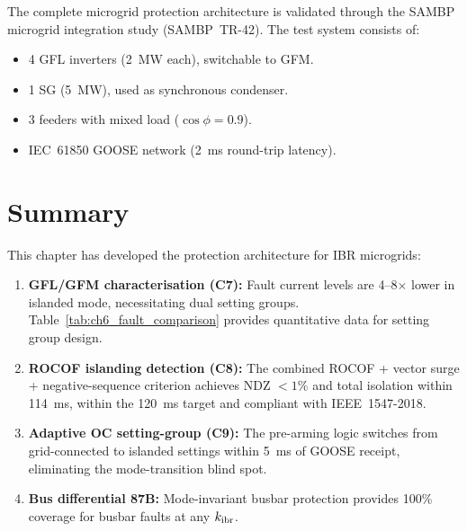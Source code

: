 The complete microgrid protection architecture is validated through the
SAMBP microgrid integration study (SAMBP~TR-42).
The test system consists of:
\begin{itemize}
\item 4 GFL inverters (2~MW each), switchable to GFM.
\item 1 SG (5~MW), used as synchronous condenser.
\item 3 feeders with mixed load ($\cos\phi = 0.9$).
\item IEC~61850 GOOSE network (2~ms round-trip latency).
\end{itemize}


\section{Summary}
\label{sec:ch6_summary}

This chapter has developed the protection architecture for IBR microgrids:
\begin{enumerate}
\item \textbf{GFL/GFM characterisation (C7):} Fault current levels are
      4--8$\times$ lower in islanded mode, necessitating dual setting groups.
      Table~\ref{tab:ch6_fault_comparison} provides quantitative data for
      setting group design.
\item \textbf{ROCOF islanding detection (C8):} The combined ROCOF +
      vector surge + negative-sequence criterion achieves NDZ $< 1\%$
      and total isolation within 114~ms, within the 120~ms target and
      compliant with IEEE~1547-2018.
\item \textbf{Adaptive OC setting-group (C9):} The pre-arming logic
      switches from grid-connected to islanded settings within 5~ms of
      GOOSE receipt, eliminating the mode-transition blind spot.
\item \textbf{Bus differential 87B:} Mode-invariant busbar protection
      provides 100\% coverage for busbar faults at any $k_\mathrm{ibr}$.
\end{enumerate}
